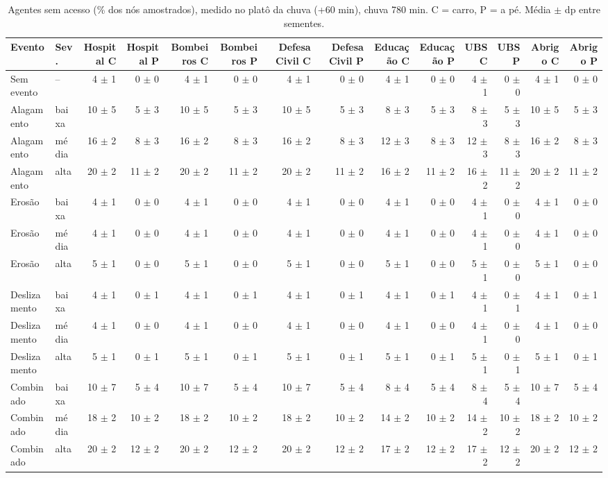 \begin{table}[htbp]
\centering
\tiny
\caption{Agentes sem acesso (\% dos nós amostrados), medido no platô da chuva (+60 min), chuva 780 min. C = carro, P = a pé. Média $\pm$ dp entre sementes.}
\label{tab:t4_plato_780}
\begin{tabular}{llrrrrrrrrrrrr}
\toprule
Evento & Sev. & Hospital C & Hospital P & Bombeiros C & Bombeiros P & Defesa Civil C & Defesa Civil P & Educação C & Educação P & UBS C & UBS P & Abrigo C & Abrigo P \\
\midrule
Sem evento & -- & 4 $\pm$ 1 & 0 $\pm$ 0 & 4 $\pm$ 1 & 0 $\pm$ 0 & 4 $\pm$ 1 & 0 $\pm$ 0 & 4 $\pm$ 1 & 0 $\pm$ 0 & 4 $\pm$ 1 & 0 $\pm$ 0 & 4 $\pm$ 1 & 0 $\pm$ 0 \\
Alagamento & baixa & 10 $\pm$ 5 & 5 $\pm$ 3 & 10 $\pm$ 5 & 5 $\pm$ 3 & 10 $\pm$ 5 & 5 $\pm$ 3 & 8 $\pm$ 3 & 5 $\pm$ 3 & 8 $\pm$ 3 & 5 $\pm$ 3 & 10 $\pm$ 5 & 5 $\pm$ 3 \\
Alagamento & média & 16 $\pm$ 2 & 8 $\pm$ 3 & 16 $\pm$ 2 & 8 $\pm$ 3 & 16 $\pm$ 2 & 8 $\pm$ 3 & 12 $\pm$ 3 & 8 $\pm$ 3 & 12 $\pm$ 3 & 8 $\pm$ 3 & 16 $\pm$ 2 & 8 $\pm$ 3 \\
Alagamento & alta & 20 $\pm$ 2 & 11 $\pm$ 2 & 20 $\pm$ 2 & 11 $\pm$ 2 & 20 $\pm$ 2 & 11 $\pm$ 2 & 16 $\pm$ 2 & 11 $\pm$ 2 & 16 $\pm$ 2 & 11 $\pm$ 2 & 20 $\pm$ 2 & 11 $\pm$ 2 \\
Erosão & baixa & 4 $\pm$ 1 & 0 $\pm$ 0 & 4 $\pm$ 1 & 0 $\pm$ 0 & 4 $\pm$ 1 & 0 $\pm$ 0 & 4 $\pm$ 1 & 0 $\pm$ 0 & 4 $\pm$ 1 & 0 $\pm$ 0 & 4 $\pm$ 1 & 0 $\pm$ 0 \\
Erosão & média & 4 $\pm$ 1 & 0 $\pm$ 0 & 4 $\pm$ 1 & 0 $\pm$ 0 & 4 $\pm$ 1 & 0 $\pm$ 0 & 4 $\pm$ 1 & 0 $\pm$ 0 & 4 $\pm$ 1 & 0 $\pm$ 0 & 4 $\pm$ 1 & 0 $\pm$ 0 \\
Erosão & alta & 5 $\pm$ 1 & 0 $\pm$ 0 & 5 $\pm$ 1 & 0 $\pm$ 0 & 5 $\pm$ 1 & 0 $\pm$ 0 & 5 $\pm$ 1 & 0 $\pm$ 0 & 5 $\pm$ 1 & 0 $\pm$ 0 & 5 $\pm$ 1 & 0 $\pm$ 0 \\
Deslizamento & baixa & 4 $\pm$ 1 & 0 $\pm$ 1 & 4 $\pm$ 1 & 0 $\pm$ 1 & 4 $\pm$ 1 & 0 $\pm$ 1 & 4 $\pm$ 1 & 0 $\pm$ 1 & 4 $\pm$ 1 & 0 $\pm$ 1 & 4 $\pm$ 1 & 0 $\pm$ 1 \\
Deslizamento & média & 4 $\pm$ 1 & 0 $\pm$ 0 & 4 $\pm$ 1 & 0 $\pm$ 0 & 4 $\pm$ 1 & 0 $\pm$ 0 & 4 $\pm$ 1 & 0 $\pm$ 0 & 4 $\pm$ 1 & 0 $\pm$ 0 & 4 $\pm$ 1 & 0 $\pm$ 0 \\
Deslizamento & alta & 5 $\pm$ 1 & 0 $\pm$ 1 & 5 $\pm$ 1 & 0 $\pm$ 1 & 5 $\pm$ 1 & 0 $\pm$ 1 & 5 $\pm$ 1 & 0 $\pm$ 1 & 5 $\pm$ 1 & 0 $\pm$ 1 & 5 $\pm$ 1 & 0 $\pm$ 1 \\
Combinado & baixa & 10 $\pm$ 7 & 5 $\pm$ 4 & 10 $\pm$ 7 & 5 $\pm$ 4 & 10 $\pm$ 7 & 5 $\pm$ 4 & 8 $\pm$ 4 & 5 $\pm$ 4 & 8 $\pm$ 4 & 5 $\pm$ 4 & 10 $\pm$ 7 & 5 $\pm$ 4 \\
Combinado & média & 18 $\pm$ 2 & 10 $\pm$ 2 & 18 $\pm$ 2 & 10 $\pm$ 2 & 18 $\pm$ 2 & 10 $\pm$ 2 & 14 $\pm$ 2 & 10 $\pm$ 2 & 14 $\pm$ 2 & 10 $\pm$ 2 & 18 $\pm$ 2 & 10 $\pm$ 2 \\
Combinado & alta & 20 $\pm$ 2 & 12 $\pm$ 2 & 20 $\pm$ 2 & 12 $\pm$ 2 & 20 $\pm$ 2 & 12 $\pm$ 2 & 17 $\pm$ 2 & 12 $\pm$ 2 & 17 $\pm$ 2 & 12 $\pm$ 2 & 20 $\pm$ 2 & 12 $\pm$ 2 \\
\bottomrule
\end{tabular}
\end{table}

